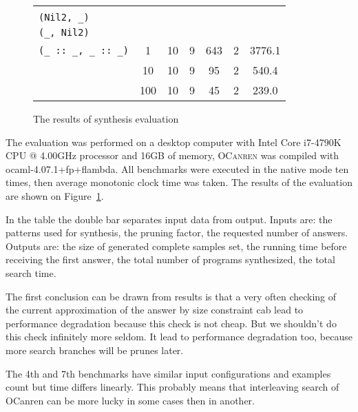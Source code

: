 \begin{figure}[t]
\begin{tabular}{m{3cm}|cc||cccc}
{{\lstinline[basicstyle=\scriptsize]|(_, Nil)|\\[-1mm]
\lstinline[basicstyle=\scriptsize]|(Nil2, _)|\\[-1mm]
\lstinline[basicstyle=\scriptsize]|(_, Nil2)|\\[-1mm]
\lstinline[basicstyle=\scriptsize]|(_ :: _, _ :: _)|}}
         & 1&10&9&643&2&3776.1\\[3mm]
        \cline{2-7}
      &10&10&9&95&2&540.4\\[3mm]
        \cline{2-7}
     &100&10&9&45&2&239.0                         
  \end{tabular}
  \caption{The results of synthesis evaluation}
  \label{fig:eval}
\begin{comment}
\csvreader[tabular=|r|p{3cm}|p{1cm}|p{1.5cm}||p{1.5cm}|p{1.5cm}|p{1.2cm}|p{1.5cm}|,
table head=\hline & Name & Prunes & Answers requested &Example generated&  1st answer time & Answers found & Total search time \\ \hline\hline,
late after line=\\\hline]%
{bench.csv}{}%
{\thecsvrow & \csvcoli & \csvcolii & \csvcoliii & \csvcoliv & \csvcolv & \csvcolvi& \csvcolvii }
\caption{Benchmarks. Input data is on the left side of double dash $\mid\mid$ and result are on the right}
\label{fig:bench} 
\end{comment}
\end{figure}



The evaluation was performed on a desktop computer with Intel Core i7-4790K CPU @ 4.00GHz processor and 16GB of memory,
\textsc{OCanren} was compiled with \mbox{ocaml-4.07.1+fp+flambda}. All benchmarks were executed in the native mode ten times,
then average monotonic clock time was taken. The results of the evaluation are shown on Figure~\ref{fig:eval}.

In the table the double bar separates input data from output. Inputs are: the patterns used for synthesis, the pruning factor,
the requested number of answers. Outputs are: the size of generated complete samples set, the running time before receiving the first answer,
the total number of programs synthesized, the total search time.

The first conclusion can be drawn from results is that a very often checking
of the current approximation of the answer by size constraint
cab lead to performance degradation
because this check is not cheap. But we shouldn't do this check infinitely more seldom. It lead to performance degradation too,
because more search branches will be prunes later.

The 4th and 7th benchmarks have similar input configurations and examples count but time differs linearly. This probably means that interleaving search of OCanren can be more lucky in some cases then in another.
